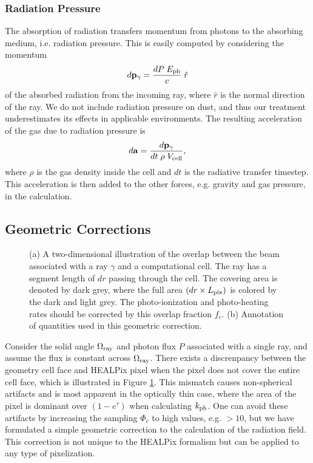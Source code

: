 \documentclass[12pt,preprint]{aastex}
\begin{document}
\subsubsection{Radiation Pressure}

The absorption of radiation transfers momentum from photons to the
absorbing medium, i.e. radiation pressure.  This is easily computed by
considering the momentum
\begin{equation}
  d\mathbf{p}_\gamma = \frac{dP \; E_{\rm ph}}{c} \; \hat{r}
\end{equation}
of the absorbed radiation from the incoming ray, where $\hat{r}$ is
the normal direction of the ray.  We do not include radiation pressure
on dust, and thus our treatment underestimates its effects in
applicable environments.  The resulting acceleration of the gas due to
radiation pressure is
\begin{equation}
  d\mathbf{a} = \frac{d\mathbf{p}_\gamma} {dt\; \rho \; V_{\rm cell}},
\end{equation}
where $\rho$ is the gas density inside the cell and $dt$ is the
radiative transfer timestep.  This acceleration is then added to the
other forces, e.g. gravity and gas pressure, in the calculation.

\subsection{Geometric Corrections}
\label{sec:meth_fc}

\begin{figure}[t]
  \caption{\label{fig:covering} (a) A two-dimensional illustration of
    the overlap between the beam associated with a ray $\gamma$ and a
    computational cell.  The ray has a segment length of $dr$ passing
    through the cell.  The covering area is denoted by dark grey,
    where the full area $(dr \times L_{\rm pix})$ is colored by the
    dark and light grey.  The photo-ionization and photo-heating rates
    should be corrected by this overlap fraction $f_c$.  (b)
    Annotation of quantities used in this geometric correction.}
\end{figure}

Consider the solid angle $\Omega_{\rm ray}$ and photon flux $P$
associated with a single ray, and assume the flux is constant across
$\Omega_{\rm ray}$.  There exists a discrenpancy between the geometry
cell face and HEALPix pixel when the pixel does not cover the entire
cell face, which is illustrated in Figure \ref{fig:covering}.  This
mismatch causes non-spherical artifacts and is most apparent in the
optically thin case, where the area of the pixel is dominant over $(1
- e^\tau)$ when calculating $k_{\rm ph}$.  One can avoid these
artifacts by increasing the sampling $\Phi_c$ to high values,
e.g. $>10$, but we have formulated a simple geometric correction to
the calculation of the radiation field.  This correction is not unique
to the HEALPix formalism but can be applied to any type of
pixelization.
\end{document}
